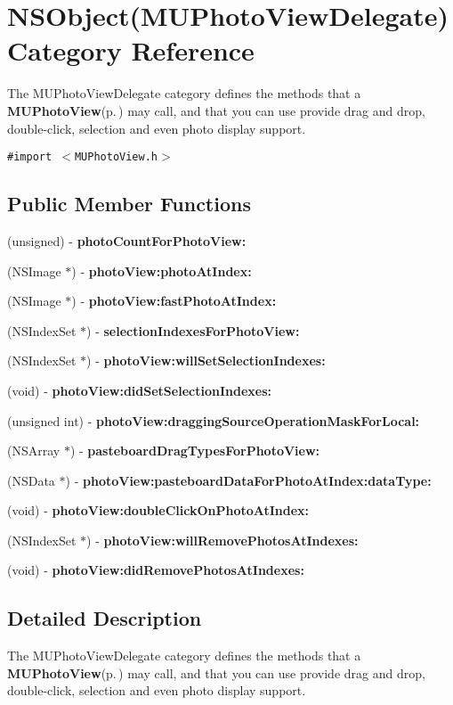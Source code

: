 \section{NSObject(MUPhoto\-View\-Delegate) Category Reference}
\label{category_n_s_object(_m_u_photo_view_delegate)}
The MUPhoto\-View\-Delegate category defines the methods that a {\bf MUPhoto\-View}{\rm (p.\,\pageref{interface_m_u_photo_view})} may call, and that you can use provide drag and drop, double-click, selection and even photo display support.  


{\tt \#import $<$MUPhoto\-View.h$>$}

\subsection*{Public Member Functions}
\begin{CompactItemize}
\item 
(unsigned) - {\bf photo\-Count\-For\-Photo\-View:}
\item 
(NSImage $\ast$) - {\bf photo\-View:photo\-At\-Index:}
\item 
(NSImage $\ast$) - {\bf photo\-View:fast\-Photo\-At\-Index:}
\item 
(NSIndex\-Set $\ast$) - {\bf selection\-Indexes\-For\-Photo\-View:}
\item 
(NSIndex\-Set $\ast$) - {\bf photo\-View:will\-Set\-Selection\-Indexes:}
\item 
(void) - {\bf photo\-View:did\-Set\-Selection\-Indexes:}
\item 
(unsigned int) - {\bf photo\-View:dragging\-Source\-Operation\-Mask\-For\-Local:}
\item 
(NSArray $\ast$) - {\bf pasteboard\-Drag\-Types\-For\-Photo\-View:}
\item 
(NSData $\ast$) - {\bf photo\-View:pasteboard\-Data\-For\-Photo\-At\-Index:data\-Type:}
\item 
(void) - {\bf photo\-View:double\-Click\-On\-Photo\-At\-Index:}
\item 
(NSIndex\-Set $\ast$) - {\bf photo\-View:will\-Remove\-Photos\-At\-Indexes:}
\item 
(void) - {\bf photo\-View:did\-Remove\-Photos\-At\-Indexes:}
\end{CompactItemize}


\subsection{Detailed Description}
The MUPhoto\-View\-Delegate category defines the methods that a {\bf MUPhoto\-View}{\rm (p.\,\pageref{interface_m_u_photo_view})} may call, and that you can use provide drag and drop, double-click, selection and even photo display support. 

